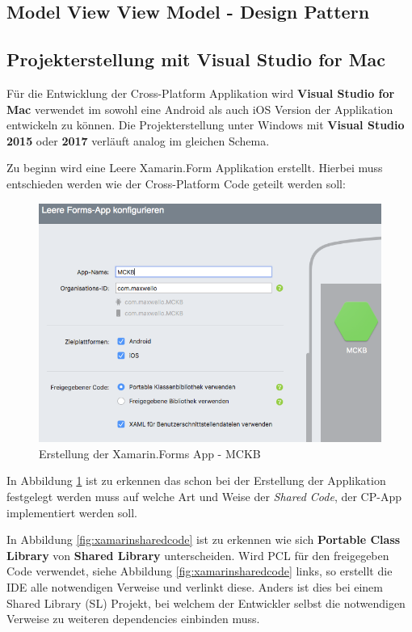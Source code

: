 \subsection{Model View View Model - Design Pattern}
\label{sec:xamarinformsmvvm}

\newpage
\subsection{Projekterstellung mit Visual Studio for Mac}
\label{sec:xamarincreateproject}

	Für die Entwicklung der Cross-Platform Applikation wird \textbf{Visual Studio for Mac} verwendet im sowohl eine Android als auch iOS Version der Applikation entwickeln zu können. Die Projekterstellung unter Windows mit \textbf{Visual Studio 2015} oder \textbf{2017} verläuft analog im gleichen Schema.

	Zu beginn wird eine Leere Xamarin.Form Applikation erstellt. Hierbei muss entschieden werden wie der Cross-Platform Code geteilt werden soll:

	\begin{figure}[h!]
		\centering
		\includegraphics[width=1\textwidth]{images/Project-Setup-one.png}
		\caption{Erstellung der Xamarin.Forms App - MCKB}
		\label{fig:xamarinprojectstart}
	\end{figure}

	In Abbildung \ref{fig:xamarinprojectstart} ist zu erkennen das schon bei der Erstellung der Applikation festgelegt werden muss auf welche Art und Weise der \textit{Shared Code}, der CP-App implementiert werden soll.

	In Abbildung \ref{fig:xamarinsharedcode} ist zu erkennen wie sich \textbf{Portable Class Library} von \textbf{Shared Library} unterscheiden. Wird PCL für den freigegeben Code verwendet, siehe Abbildung \ref{fig:xamarinsharedcode} links, so erstellt die IDE alle notwendigen Verweise und verlinkt diese. Anders ist dies bei einem Shared Library (SL) Projekt, bei welchem der Entwickler selbst die notwendigen Verweise zu weiteren dependencies einbinden muss.

